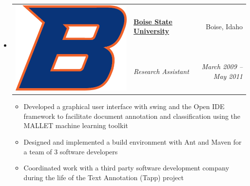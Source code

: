\documentclass[letterpaper,11pt]{article}
\makeatletter
\newcommand{\resitem}[1]{\item #1 \vspace{-2pt}}
\newcommand{\ressubheadingG}[5]{
\item[]
	\begin{tabular*}{6.5in}{l@{\hspace{.1in}} l@{\extracolsep{\fill}}r}
		\multirow{2}{1in}{#1} & \textbf{#2} & #3 \\
		& \textit{#4} & \textit{#5} \\
         \end{tabular*}
	 \vspace{-6pt}}
\makeatother
\begin{document}
\begin{itemize}
 \ressubheadingG
    {\includegraphics[scale=.3]{bsu.jpg}}
    {{\href{https://boisestate.edu}{Boise State University}}}
    {Boise, Idaho}
    {Research Assistant}
    {March 2009 -- May 2011}
    { \footnotesize
    \begin{itemize}
      \resitem {Developed a graphical user interface with swing
                and the Open IDE framework to facilitate document annotation and
                classification using the MALLET machine learning toolkit}
      \resitem {Designed and implemented a build environment with Ant
                and Maven for a team of 3 software developers}
      \resitem {Coordinated work with a third party software
                development company during the life of the Text Annotation
                (Tapp) project}
    \end{itemize}
    }



\end{itemize}
\end{document}
